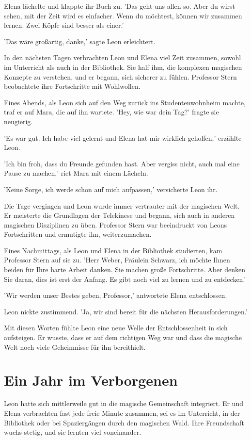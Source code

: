 \documentclass[12pt]{article}
\begin{document}
Elena lächelte und klappte ihr Buch zu. 'Das geht uns allen so. Aber du wirst sehen, mit der Zeit wird es einfacher. Wenn du möchtest, können wir zusammen lernen. Zwei Köpfe sind besser als einer.'

'Das wäre großartig, danke,' sagte Leon erleichtert.

In den nächsten Tagen verbrachten Leon und Elena viel Zeit zusammen, sowohl im Unterricht als auch in der Bibliothek. Sie half ihm, die komplexen magischen Konzepte zu verstehen, und er begann, sich sicherer zu fühlen. Professor Stern beobachtete ihre Fortschritte mit Wohlwollen.

Eines Abends, als Leon sich auf den Weg zurück ins Studentenwohnheim machte, traf er auf Mara, die auf ihn wartete. 'Hey, wie war dein Tag?' fragte sie neugierig.

'Es war gut. Ich habe viel gelernt und Elena hat mir wirklich geholfen,' erzählte Leon.

'Ich bin froh, dass du Freunde gefunden hast. Aber vergiss nicht, auch mal eine Pause zu machen,' riet Mara mit einem Lächeln.

'Keine Sorge, ich werde schon auf mich aufpassen,' versicherte Leon ihr.

Die Tage vergingen und Leon wurde immer vertrauter mit der magischen Welt. Er meisterte die Grundlagen der Telekinese und begann, sich auch in anderen magischen Disziplinen zu üben. Professor Stern war beeindruckt von Leons Fortschritten und ermutigte ihn, weiterzumachen.

Eines Nachmittags, als Leon und Elena in der Bibliothek studierten, kam Professor Stern auf sie zu. 'Herr Weber, Fräulein Schwarz, ich möchte Ihnen beiden für Ihre harte Arbeit danken. Sie machen große Fortschritte. Aber denken Sie daran, dies ist erst der Anfang. Es gibt noch viel zu lernen und zu entdecken.'

'Wir werden unser Bestes geben, Professor,' antwortete Elena entschlossen.

Leon nickte zustimmend. 'Ja, wir sind bereit für die nächsten Herausforderungen.'

Mit diesen Worten fühlte Leon eine neue Welle der Entschlossenheit in sich aufsteigen. Er wusste, dass er auf dem richtigen Weg war und dass die magische Welt noch viele Geheimnisse für ihn bereithielt.

\section{ Ein Jahr im Verborgenen }
Leon hatte sich mittlerweile gut in die magische Gemeinschaft integriert. Er und Elena verbrachten fast jede freie Minute zusammen, sei es im Unterricht, in der Bibliothek oder bei Spaziergängen durch den magischen Wald. Ihre Freundschaft wuchs stetig, und sie lernten viel voneinander.
\end{document}
